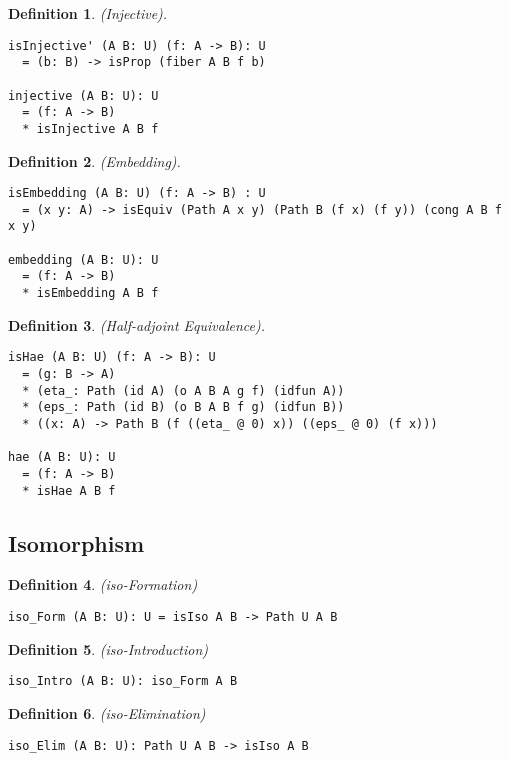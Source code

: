 \documentclass{article}
\newtheorem{definition}{Definition}
\begin{document}
\begin{definition} (Injective).
\begin{lstlisting}
isInjective' (A B: U) (f: A -> B): U
  = (b: B) -> isProp (fiber A B f b)

injective (A B: U): U
  = (f: A -> B)
  * isInjective A B f
\end{lstlisting}
\end{definition}

\begin{definition} (Embedding).
\begin{lstlisting}
isEmbedding (A B: U) (f: A -> B) : U
  = (x y: A) -> isEquiv (Path A x y) (Path B (f x) (f y)) (cong A B f x y)

embedding (A B: U): U
  = (f: A -> B)
  * isEmbedding A B f
\end{lstlisting}
\end{definition}

\begin{definition} (Half-adjoint Equivalence).
\begin{lstlisting}
isHae (A B: U) (f: A -> B): U
  = (g: B -> A)
  * (eta_: Path (id A) (o A B A g f) (idfun A))
  * (eps_: Path (id B) (o B A B f g) (idfun B))
  * ((x: A) -> Path B (f ((eta_ @ 0) x)) ((eps_ @ 0) (f x)))

hae (A B: U): U
  = (f: A -> B)
  * isHae A B f
\end{lstlisting}
\end{definition}

\newpage
\subsection{Isomorphism}

\begin{definition} (iso-Formation)
\begin{lstlisting}
iso_Form (A B: U): U = isIso A B -> Path U A B
\end{lstlisting}
\end{definition}

\begin{definition} (iso-Introduction)
\begin{lstlisting}
iso_Intro (A B: U): iso_Form A B
\end{lstlisting}
\end{definition}

\begin{definition} (iso-Elimination)
\begin{lstlisting}
iso_Elim (A B: U): Path U A B -> isIso A B
\end{lstlisting}
\end{definition}
\end{document}
